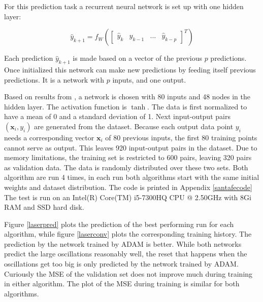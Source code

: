 For this prediction task a recurrent neural network is set up with one hidden layer:

\begin{equation}
\hat{y}_{k+1} = f_W(\begin{bmatrix} \hat{y}_{k} & \hat{y}_{k-1} & ... & \hat{y}_{k-p}\end{bmatrix}^T)
\end{equation}

Each prediction $\hat{y}_{k+1}$ is made based on a vector of the previous $p$ predictions. Once initialized this network can make new predictions by feeding itself previous predictions. It is a network with $p$ inputs, and one output. 

Based on results from \cite{suykens2020}, a network is chosen with 80 inputs and 48 nodes in the hidden layer. The activation function is $\tanh$. The data is first normalized to have a mean of 0 and a standard deviation of 1. Next input-output pairs $(\textbf{x}_i,y_i)$  are generated from the dataset. Because each output data point $y_i$ needs a corresponding vector $\textbf{x}_i$ of 80 previous inputs, the first 80 training points cannot serve as output. This leaves 920 input-output pairs in the dataset. Due to memory limitations, the training set is restricted to 600 pairs, leaving 320 pairs as validation data. The data is randomly distributed over these two sets. Both algorithm are run 4 times, in each run both algorithms start with the same initial weights and dataset distribution. The code is printed in Appendix \ref{santafecode} The test is run on an Intel(R) Core(TM) i5-7300HQ CPU @ 2.50GHz with 8Gi RAM and SSD hard disk.

Figure \ref{laserpred} plots the prediction of the best performing run for each algorithm, while figure \ref{laserconv} plots the corresponding training history. The prediction by the network trained by ADAM is better. While both networks predict the large oscillations reasonably well, the reset that happens when the oscillations get too big is only predicted by the network trained by ADAM. Curiously the MSE of the validation set does not improve much during training in either algorithm. The plot of the MSE during training is similar for both algorithms.

